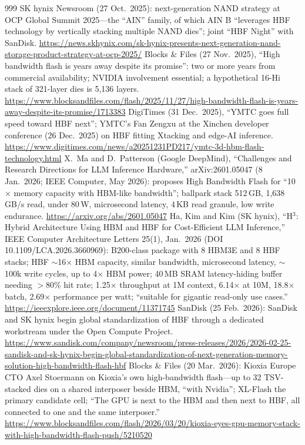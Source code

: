 \begin{thebibliography}{999}
 SK hynix Newsroom (27 Oct.\ 2025): next-generation NAND strategy at OCP Global Summit 2025---the ``AIN'' family, of which AIN B ``leverages HBF technology by vertically stacking multiple NAND dies''; joint ``HBF Night'' with SanDisk. \url{https://news.skhynix.com/sk-hynix-presents-next-generation-nand-storage-product-strategy-at-ocp-2025/}
 Blocks \& Files (27 Nov.\ 2025), ``High bandwidth flash is years away despite its promise'': two or more years from commercial availability; NVIDIA involvement essential; a hypothetical 16-Hi stack of 321-layer dies is 5,136 layers. \url{https://www.blocksandfiles.com/flash/2025/11/27/high-bandwidth-flash-is-years-away-despite-its-promise/1713383}
 DigiTimes (31 Dec.\ 2025), ``YMTC goes full speed toward HBF next''; YMTC's Fan Zengxu at the Xinchen developer conference (26 Dec.\ 2025) on HBF fitting Xtacking and edge-AI inference. \url{https://www.digitimes.com/news/a20251231PD217/ymtc-3d-hbm-flash-technology.html}
 X.~Ma and D.~Patterson (Google DeepMind), ``Challenges and Research Directions for LLM Inference Hardware,'' arXiv:2601.05047 (8 Jan.\ 2026; IEEE Computer, May 2026): proposes High Bandwidth Flash for ``10$\times$ memory capacity with HBM-like bandwidth''; ballpark stack 512\,GB, 1,638\,GB/s read, under 80\,W, microsecond latency, 4\,KB read granule, low write endurance. \url{https://arxiv.org/abs/2601.05047}
 Ha, Kim and Kim (SK hynix), ``H$^3$: Hybrid Architecture Using HBM and HBF for Cost-Efficient LLM Inference,'' IEEE Computer Architecture Letters 25(1), Jan.\ 2026 (DOI 10.1109/LCA.2026.3660969): B200-class package with 8 HBM3E and 8 HBF stacks; HBF $\sim$16$\times$ HBM capacity, similar bandwidth, microsecond latency, $\sim$100k write cycles, up to 4$\times$ HBM power; 40\,MB SRAM latency-hiding buffer needing $>$80\% hit rate; 1.25$\times$ throughput at 1M context, 6.14$\times$ at 10M, 18.8$\times$ batch, 2.69$\times$ performance per watt; ``suitable for gigantic read-only use cases.'' \url{https://ieeexplore.ieee.org/document/11371745}
 SanDisk (25 Feb.\ 2026): SanDisk and SK hynix begin global standardization of HBF through a dedicated workstream under the Open Compute Project. \url{https://www.sandisk.com/company/newsroom/press-releases/2026/2026-02-25-sandisk-and-sk-hynix-begin-global-standardization-of-next-generation-memory-solution-high-bandwidth-flash-hbf}
 Blocks \& Files (20 Mar.\ 2026): Kioxia Europe CTO Axel Stoermann on Kioxia's own high-bandwidth flash---up to 32 TSV-stacked dies on a shared interposer beside HBM, ``with Nvidia''; XL-Flash the primary candidate cell; ``The GPU is next to the HBM and then next to HBF, all connected to one and the same interposer.'' \url{https://www.blocksandfiles.com/flash/2026/03/20/kioxia-eyes-gpu-memory-stack-with-high-bandwidth-flash-push/5210520}

\end{thebibliography}
